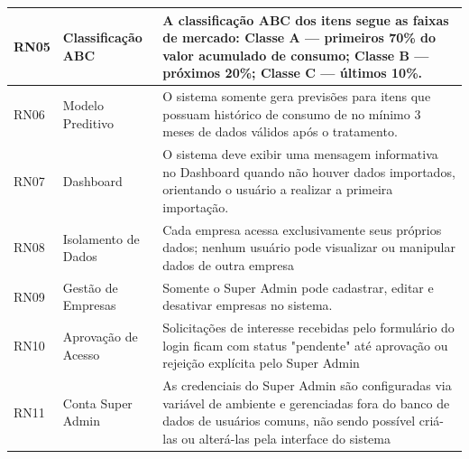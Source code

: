 \documentclass[12pt,a4paper]{article}
\begin{document}
\begin{longtable}{p{} p{} p{}}
    RN05            & Classificação ABC   & A classificação ABC dos itens segue as faixas de mercado: Classe A — primeiros 70\% do valor acumulado de consumo; Classe B — próximos 20\%; Classe C — últimos 10\%.                                                                                                            \\\midrule

    RN06            & Modelo Preditivo    & O sistema somente gera previsões para itens que possuam histórico de consumo de no mínimo 3 meses de dados válidos após o tratamento.                                                                                                                                            \\\midrule

    RN07            & Dashboard           & O sistema deve exibir uma mensagem informativa no Dashboard quando não houver dados importados, orientando o usuário a realizar a primeira importação.                                                                                                                           \\\midrule

    RN08            & Isolamento de Dados & Cada empresa acessa exclusivamente seus próprios dados; nenhum usuário pode visualizar ou manipular dados de outra empresa                                                                                                                                                       \\\midrule

    RN09            & Gestão de Empresas  & Somente o Super Admin pode cadastrar, editar e desativar empresas no sistema.                                                                                                                                                                                                    \\\midrule

    RN10            & Aprovação de Acesso & Solicitações de interesse recebidas pelo formulário do login ficam com status "pendente" até aprovação ou rejeição explícita pelo Super Admin                                                                                                                                    \\\midrule

    RN11            & Conta Super Admin   & As credenciais do Super Admin são configuradas via variável de ambiente e gerenciadas fora do banco de dados de usuários comuns, não sendo possível criá-las ou alterá-las pela interface do sistema                                                                             \\

    \bottomrule
\end{longtable}
\end{document}
